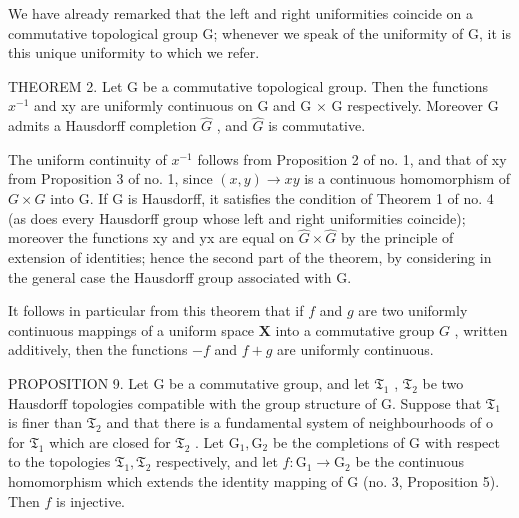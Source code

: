 We have already remarked that the left and right uniformities coincide on a commutative topological group G; whenever we speak of the uniformity of G, it is this unique uniformity to which we refer.

THEOREM 2. Let G be a commutative topological group. Then the functions \(x^{-1}\) and xy are uniformly continuous on G and G × G respectively. Moreover G admits a Hausdorff completion \(\hat{G}\) , and \(\hat{G}\) is commutative.

The uniform continuity of \(x^{-1}\) follows from Proposition 2 of no. 1, and that of xy from Proposition 3 of no. 1, since \((x, y) \to xy\) is a continuous homomorphism of \(G \times G\) into G. If G is Hausdorff, it satisfies the condition of Theorem 1 of no. 4 (as does every Hausdorff group whose left and right uniformities coincide); moreover the functions xy and yx are equal on \(\hat{G} \times \hat{G}\) by the principle of extension of identities; hence the second part of the theorem, by considering in the general case the Hausdorff group associated with G.

It follows in particular from this theorem that if \(f\) and \(g\) are two uniformly continuous mappings of a uniform space \(\mathbf{X}\) into a commutative group \(G\) , written additively, then the functions \(-f\) and \(f + g\) are uniformly continuous.

PROPOSITION 9. Let G be a commutative group, and let \(\mathfrak{T}_1\) , \(\mathfrak{T}_2\) be two Hausdorff topologies compatible with the group structure of G. Suppose that \(\mathfrak{T}_1\) is finer than \(\mathfrak{T}_2\) and that there is a fundamental system of neighbourhoods of o for \(\mathfrak{T}_1\) which are closed for \(\mathfrak{T}_2\) . Let \(\mathrm{G}_1, \mathrm{G}_2\) be the completions of G with respect to the topologies \(\mathfrak{T}_1, \mathfrak{T}_2\) respectively, and let \(f: \mathrm{G}_1 \to \mathrm{G}_2\) be the continuous homomorphism which extends the identity mapping of G (no. 3, Proposition 5). Then \(f\) is injective.

